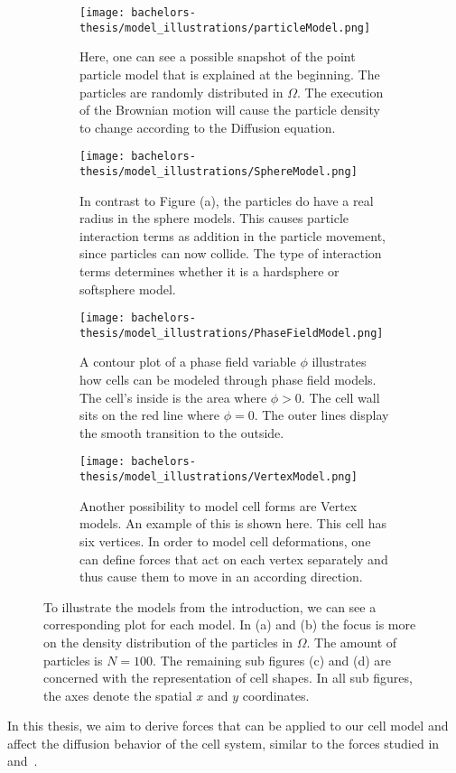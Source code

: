 \begin{figure}[t!]
	\centering
	\begin{subfigure}{0.4\textwidth}
		\texttt{[image: bachelors-thesis/model\_illustrations/particleModel.png]}
		\caption{Here, one can see a possible snapshot of the point particle model that is explained at the beginning. 
        The particles are randomly distributed in $\Omega$. 
        The execution of the Brownian motion will cause the particle density to change according to the Diffusion equation.}
	\end{subfigure}
	\hfill
	\begin{subfigure}{0.4\textwidth}
		\texttt{[image: bachelors-thesis/model\_illustrations/SphereModel.png]}
		\caption{In contrast to Figure (a), the particles do have a real radius in the sphere models. 
        This causes particle interaction terms as addition in the particle movement, since particles can now collide. 
        The type of interaction terms determines whether it is a hardsphere or softsphere model.   }
	\end{subfigure}
	\hfill
	\begin{subfigure}{0.4\textwidth}
		\texttt{[image: bachelors-thesis/model\_illustrations/PhaseFieldModel.png]}
		\caption{A contour plot of a phase field variable $\phi$ illustrates how cells can be modeled through phase field models. 
        The cell's inside is the area where $\phi > 0$. 
        The cell wall sits on the red line where $\phi = 0$. 
        The outer lines display the smooth transition to the outside. }
	\end{subfigure}\hfill
	\begin{subfigure}{0.4\textwidth}
		\texttt{[image: bachelors-thesis/model\_illustrations/VertexModel.png]}
		\caption{Another possibility to model cell forms are Vertex models. 
        An example of this is shown here. 
        This cell has six vertices. 
        In order to model cell deformations, one can define forces that act on each vertex separately and thus cause them to move in an according direction. }
	\end{subfigure}
	\caption{ To illustrate the models from the introduction, we can see a corresponding plot for each model. 
    In (a) and (b) the focus is more on the density distribution of the particles in $\Omega$. 
    The amount of particles is $N = 100$. The remaining sub figures (c) and (d) are concerned with the representation of cell shapes. 
    In all sub figures, the axes denote the spatial $x$ and $y$ coordinates. } 
	\label{fig:model_illus}
\end{figure}
In this thesis, we aim to derive forces that can be applied to our cell model and affect the diffusion behavior of the cell system, similar to the forces studied in~\cite{Bruna2012} and~\cite{Bruna2017}. \\

